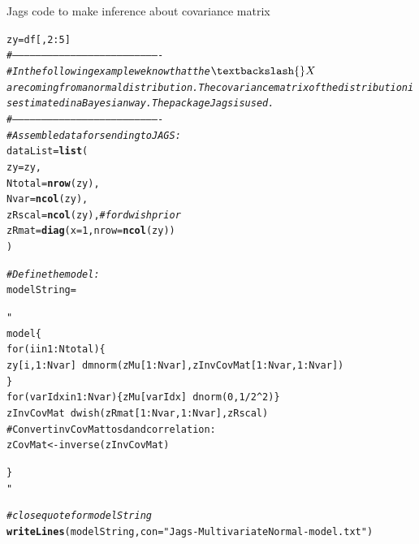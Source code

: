 \documentclass[11pt,a4paper,twoside]{book}\usepackage[]{graphicx}\usepackage[]{color}
\makeatletter
\newcommand{\hlnum}[1]{\textcolor[rgb]{0.686,0.059,0.569}{#1}}%
\newcommand{\hlstr}[1]{\textcolor[rgb]{0.192,0.494,0.8}{#1}}%
\newcommand{\hlcom}[1]{\textcolor[rgb]{0.678,0.584,0.686}{\textit{#1}}}%
\newcommand{\hlopt}[1]{\textcolor[rgb]{0,0,0}{#1}}%
\newcommand{\hlstd}[1]{\textcolor[rgb]{0.345,0.345,0.345}{#1}}%
\newcommand{\hlkwb}[1]{\textcolor[rgb]{0.69,0.353,0.396}{#1}}%
\newcommand{\hlkwc}[1]{\textcolor[rgb]{0.333,0.667,0.333}{#1}}%
\newcommand{\hlkwd}[1]{\textcolor[rgb]{0.737,0.353,0.396}{\textbf{#1}}}%
\newenvironment{kframe}{%
 \def\at@end@of@kframe{}%
 \ifinner\ifhmode%
  \def\at@end@of@kframe{\end{minipage}}%
  \begin{minipage}{\columnwidth}%
 \fi\fi%
 \def\FrameCommand##1{\hskip\@totalleftmargin \hskip-\fboxsep
 \colorbox{shadecolor}{##1}\hskip-\fboxsep
     \hskip-\linewidth \hskip-\@totalleftmargin \hskip\columnwidth}%
 \MakeFramed {\advance\hsize-\width
   \@totalleftmargin\z@ \linewidth\hsize
   \@setminipage}}%
 {\par\unskip\endMakeFramed%
 \at@end@of@kframe}
\newenvironment{knitrout}{}{} %
\makeatother
\begin{document}
\begin{codeenv}

\caption{Jags code to make inference about covariance matrix}\label{r03:covminf}
\begin{knitrout}
\color{fgcolor}\begin{kframe}
\begin{alltt}
\hlstd{zy} \hlkwb{=} \hlstd{df[,}\hlnum{2}\hlopt{:}\hlnum{5}\hlstd{]}
\hlcom{#----------------------------------------------------------------------------}
\hlcom{# In the following example we know that the $\textbackslash{}X$ are coming from a normal distribution. The covariance matrix of the distribution is estimated in aBayesian way. The package Jags is used.}
\hlcom{#----------------------------------------------------------------------------}
\hlcom{# Assemble data for sending to JAGS:}
\hlstd{dataList} \hlkwb{=} \hlkwd{list}\hlstd{(}
        \hlkwc{zy} \hlstd{= zy ,}
        \hlkwc{Ntotal} \hlstd{=}  \hlkwd{nrow}\hlstd{(zy) ,}
        \hlkwc{Nvar} \hlstd{=} \hlkwd{ncol}\hlstd{(zy) ,}
        \hlkwc{zRscal} \hlstd{=} \hlkwd{ncol}\hlstd{(zy) ,}  \hlcom{# for dwish prior}
        \hlkwc{zRmat} \hlstd{=} \hlkwd{diag}\hlstd{(}\hlkwc{x}\hlstd{=}\hlnum{1}\hlstd{,}\hlkwc{nrow}\hlstd{=}\hlkwd{ncol}\hlstd{(zy))}
\hlstd{)}

\hlcom{# Define the model:}
\hlstd{modelString} \hlkwb{=} \hlstr{"
model \{
for ( i in 1:Ntotal ) \{
zy[i,1:Nvar] ~ dmnorm( zMu[1:Nvar] , zInvCovMat[1:Nvar,1:Nvar] ) 
\}
for ( varIdx in 1:Nvar ) \{ zMu[varIdx] ~ dnorm( 0 , 1/2^2 ) \}
zInvCovMat ~ dwish( zRmat[1:Nvar,1:Nvar] , zRscal )
# Convert invCovMat to sd and correlation:
zCovMat <- inverse( zInvCovMat )

\}
"} \hlcom{# close quote for modelString}
\hlkwd{writeLines}\hlstd{( modelString ,} \hlkwc{con}\hlstd{=}\hlstr{"Jags-MultivariateNormal-model.txt"} \hlstd{)}


\end{alltt}
\end{kframe}
\end{knitrout}
\end{codeenv}
\end{document}

